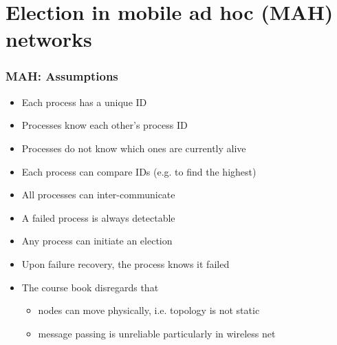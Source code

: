 \section[MAH]{Election in mobile ad hoc (MAH) networks}



\begin{frame}
  \frametitle{MAH: Assumptions}
  \begin{itemize}
  \item Each process has a unique ID
  \item Processes know each other’s process ID
  \item Processes do not know which ones are currently alive
  \item Each process can compare IDs (e.g. to find the highest)
  \item All processes can inter-communicate
  \item A failed process is always detectable
  \item Any process can initiate an election
  \item Upon failure recovery, the process knows it failed
  \item The course book disregards that
    \begin{itemize}
    \item nodes can move physically, i.e. topology is not static
    \item message passing is unreliable particularly in wireless net
    \end{itemize}
  \end{itemize}
\end{frame}



